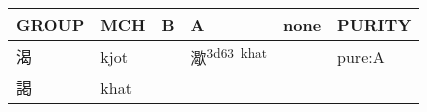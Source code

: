 \documentclass[14pt,a4paper]{scrartcl}
\begin{document}
\begin{longtable}[c]{@{}llllll@{}}
\toprule
\begin{minipage}[b]{0.14\columnwidth}\raggedright\strut
GROUP
\strut\end{minipage} &
\begin{minipage}[b]{0.14\columnwidth}\raggedright\strut
MCH
\strut\end{minipage} &
\begin{minipage}[b]{0.14\columnwidth}\raggedright\strut
B
\strut\end{minipage} &
\begin{minipage}[b]{0.14\columnwidth}\raggedright\strut
A
\strut\end{minipage} &
\begin{minipage}[b]{0.14\columnwidth}\raggedright\strut
none
\strut\end{minipage} &
\begin{minipage}[b]{0.14\columnwidth}\raggedright\strut
PURITY
\strut\end{minipage}\tabularnewline
\midrule
\endhead
\begin{minipage}[t]{0.14\columnwidth}\raggedright\strut
渴
\strut\end{minipage} &
\begin{minipage}[t]{0.14\columnwidth}\raggedright\strut
kjot
\strut\end{minipage} &
\begin{minipage}[t]{0.14\columnwidth}\raggedright\strut
\strut\end{minipage} &
\begin{minipage}[t]{0.14\columnwidth}\raggedright\strut
㵣\textsuperscript{3d63~khat}
\strut\end{minipage} &
\begin{minipage}[t]{0.14\columnwidth}\raggedright\strut
\strut\end{minipage} &
\begin{minipage}[t]{0.14\columnwidth}\raggedright\strut
pure:A
\strut\end{minipage}\tabularnewline
\begin{minipage}[t]{0.14\columnwidth}\raggedright\strut
謁
\strut\end{minipage} &
\begin{minipage}[t]{0.14\columnwidth}\raggedright\strut
khat
\strut\end{minipage} &
\begin{minipage}[t]{0.14\columnwidth}\raggedright\strut
\strut\end{minipage} &
\begin{minipage}[t]{0.14\columnwidth}\raggedright\strut

\end{minipage}
\end{longtable}
\end{document}
